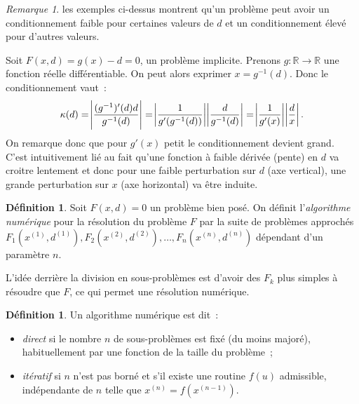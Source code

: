 \documentclass{article}
\theoremstyle{definition}
\newtheorem{déf}[thm]{Définition}
\theoremstyle{remark}
\newtheorem*{rmq}{Remarque}
\newcommand{\R}{\mathbb R}
\begin{document}
	\begin{rmq} les exemples ci-dessus montrent qu'un problème peut avoir un conditionnement faible pour certaines valeurs de $d$ et un conditionnement élevé
	pour d'autres valeurs.
	\end{rmq}

	Soit $F(x, d) = g(x) - d = 0$, un problème implicite. Prenons $g : \R \to \R$ une fonction réelle différentiable. On peut alors exprimer $x = g^{-1}(d)$.
	Donc le conditionnement vaut~:
	\[\kappa(d) = \abs {\frac {(g^{-1})'(d)d}{g^{-1}(d)}} = \abs {\frac 1{g'(g^{-1}(d))}}\abs{\frac d{g^{-1}(d)}} = \abs {\frac 1{g'(x)}}\abs{\frac dx}.\]
	On remarque donc que pour $g'(x)$ petit le conditionnement devient grand. C'est intuitivement lié au fait qu'une fonction à faible dérivée (pente) en $d$
	va croitre lentement et donc pour une faible perturbation sur $d$ (axe vertical), une grande perturbation sur $x$ (axe horizontal) va être induite.

	\begin{déf} Soit $F(x, d) = 0$ un problème bien posé. On définit l'\emph{algorithme numérique} pour la résolution du problème $F$ par la suite de problèmes
	approchés $F_1(x^{(1)}, d^{(1)}), F_2(x^{(2)}, d^{(2)}), \dotsc, F_n(x^{(n)}, d^{(n)})$ dépendant d'un paramètre $n$.
	\end{déf}

	L'idée derrière la division en sous-problèmes est d'avoir des $F_k$ plus simples à résoudre que $F$, ce qui permet une résolution numérique.

	\begin{déf} Un algorithme numérique est dit~:
	\begin{itemize}
		\item \emph{direct} si le nombre $n$ de sous-problèmes est fixé (du moins majoré), habituellement par une fonction de la taille du problème~;
		\item \emph{itératif} si $n$ n'est pas borné et s'il existe une routine $f(u)$ admissible, indépendante de $n$ telle que $x^{(n)} = f(x^{(n-1)})$.
	\end{itemize}
	\end{déf}
\end{document}

